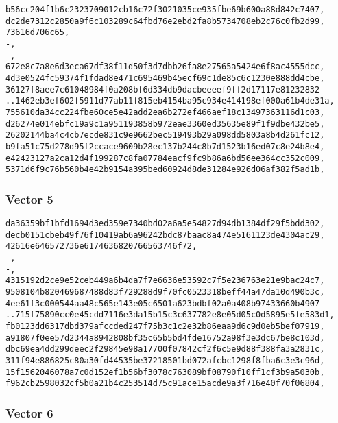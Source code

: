 \documentclass[
]{article}
\begin{document}
\begin{verbatim}
b56cc204f1b6c2323709012cb16c72f3021035ce935fbe69b600a88d842c7407,
dc2de7312c2850a9f6c103289c64fbd76e2ebd2fa8b5734708eb2c76c0fb2d99,
73616d706c65,
-,
-,
672e8c7a8e6d3eca67df38f11d50f3d7dbb26fa8e27565a5424e6f8ac4555dcc,
4d3e0524fc59374f1fdad8e471c695469b45ecf69c1de85c6c1230e888dd4cbe,
36127f8aee7c61048984f0a208bf6d334db9dacbeeeef9ff2d17117e81232832
..1462eb3ef602f5911d77ab11f815eb4154ba95c934e414198ef000a61b4de31a,
755610da34cc224fbe60ce5e42add2ea6b272ef466aef18c13497363116d1c03,
d26274e014ebfc19a9c1a951193858b972eae3360ed35635e89f1f9dbe432be5,
26202144ba4c4cb7ecde831c9e9662bec519493b29a098dd5803a8b4d261fc12,
b9fa51c75d278d95f2ccace9609b28ec137b244c8b7d1523b16ed07c8e24b8e4,
e42423127a2ca12d4f199287c8fa07784eacf9fc9b86a6bd56ee364cc352c009,
5371d6f9c76b560b4e42b9154a395bed60924d8de31284e926d06af382f5ad1b,
\end{verbatim}

\subsubsection{Vector 5}\label{vector-5-1}

\begin{verbatim}
da36359bf1bfd1694d3ed359e7340bd02a6a5e54827d94db1384df29f5bdd302,
decb0151cbeb49f76f10419ab6a96242bdc87baac8a474e5161123de4304ac29,
42616e646572736e6174636820766563746f72,
-,
-,
4315192d2ce9e52ceb449a6b4da7f7e6636e53592c7f5e236763e21e9bac24c7,
9508104b820469687488d83f729288d9f70fc0523318beff44a47da10d490b3c,
4ee61f3c000544aa48c565e143e05c6501a623bdbf02a0a408b97433660b4907
..715f75890cc0e45cdd7116e3da15b15c3c637782e8e05d05c0d5895e5fe583d1,
fb0123dd6317dbd379afccded247f75b3c1c2e32b86eaa9d6c9d0eb5bef07919,
a91807f0ee57d2344a8942808bf35c65b5bd4fde16752a98f3e3dc67be8c103d,
dbc69ea4dd299deec2f29845e98a17700f07842cf2f6c5e9d88f388fa3a2831c,
311f94e886825c80a30fd44535be37218501bd072afcbc1298f8fba6c3e3c96d,
15f1562046078a7c0d152ef1b56bf3078c763089bf08790f10ff1cf3b9a5030b,
f962cb2598032cf5b0a21b4c253514d75c91ace15acde9a3f716e40f70f06804,
\end{verbatim}

\subsubsection{Vector 6}\label{vector-6-1}
\end{document}
